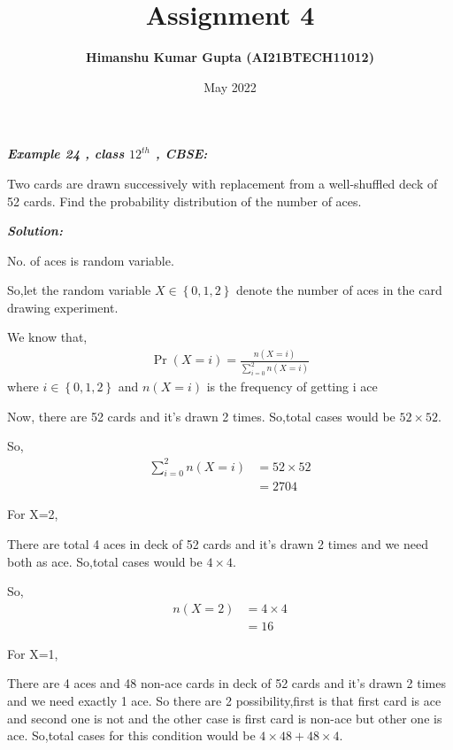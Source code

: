 \documentclass[journal,12pt,twocolumn]{IEEEtran}
\providecommand{\brak}[1]{\ensuremath{\left(#1\right)}}
\providecommand{\cbrak}[1]{\ensuremath{\left\{#1\right\}}}
\begin{document}
\newcommand{\myvec}[1]{\ensuremath{\begin{pmatrix}#1\end{pmatrix}}}
\let\vec\mathbf

\title{Assignment 4}
\author{\textbf{Himanshu Kumar Gupta (AI21BTECH11012)}}
\maketitle
\date {May 2022}

\textbf{\textit{Example 24 , class $12^{th}$ , CBSE:}}

Two cards are drawn successively with replacement from a well-shuffled
deck of 52 cards. Find the probability distribution of the number of aces.

\textbf{\textit{Solution:}}

No. of aces is random variable.

So,let the random variable $X\in{\cbrak{0,1,2}}$ denote
the number of aces in the card drawing experiment.

We know that,
\begin{align}
\label{eq:1}
\Pr\brak{X = i} = \frac{n\brak{X = i}}{\sum_{i=0}^2 n\brak{X = i}}
\end{align}
where $i\in\cbrak{{0,1,2}}$ and $n\brak{X = i}$ is the frequency of getting i ace

Now, there are 52 cards and it's drawn 2 times. So,total cases would be $52\times52$.

So,
\begin{align}
\label{eq:2}
\sum_{i=0}^2 n\brak{X = i}&=52\times52 \nonumber \\
&=2704
\end{align}

For X=2,

There are total 4 aces in deck of 52 cards and it's drawn 2 times and we need both as ace. So,total cases would be $4\times4$.

So,
\begin{align}
\label{eq:3}
n\brak{X = 2}&=4\times4     \nonumber  \\
&=16
\end{align}

For X=1,

There are 4 aces and 48 non-ace cards in deck of 52 cards and it's drawn 2 times and we need exactly 1 ace. So there are 2 possibility,first is that first card is ace and second one is not and the other case is first card is non-ace but other one is ace. So,total cases for this condition would be $4\times48+48\times4$.
\end{document}
